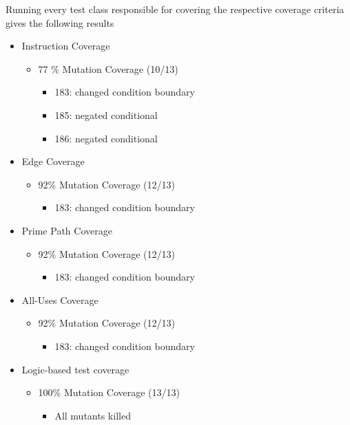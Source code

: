 \documentclass[12pt]{article}
\begin{document}
Running every test class responsible for covering the respective coverage criteria gives the following results
\renewcommand{\labelitemi}{$\blacksquare$}
\renewcommand\labelitemii{$\square$}
 \begin{itemize}
   \item  Instruction Coverage
   \begin{itemize}
     \item {77 \% Mutation Coverage (10/13)}
     \begin{itemize}
       \item  183: changed condition boundary
	   \item  185: negated conditional
	   \item  186: negated conditional
     \end{itemize}
   \end{itemize}
   \item  Edge Coverage
   \begin{itemize}
     \item {92\% Mutation Coverage (12/13)}
     \begin{itemize}
       \item  183: changed condition boundary
     \end{itemize}
   \end{itemize}
   \item Prime Path Coverage
   \begin{itemize}
     \item {92\% Mutation Coverage (12/13)}
     \begin{itemize}
       \item  183: changed condition boundary
     \end{itemize}
   \end{itemize}
  \item All-Uses Coverage
   \begin{itemize}
     \item {92\% Mutation Coverage (12/13)}
     \begin{itemize}
       \item  183: changed condition boundary
     \end{itemize}
   \end{itemize}
   \item Logic-based test coverage
   \begin{itemize}
     \item {100\% Mutation Coverage (13/13)}
     \begin{itemize}
       \item  All mutants killed
     \end{itemize}
   \end{itemize}
 \end{itemize}
\end{document}
